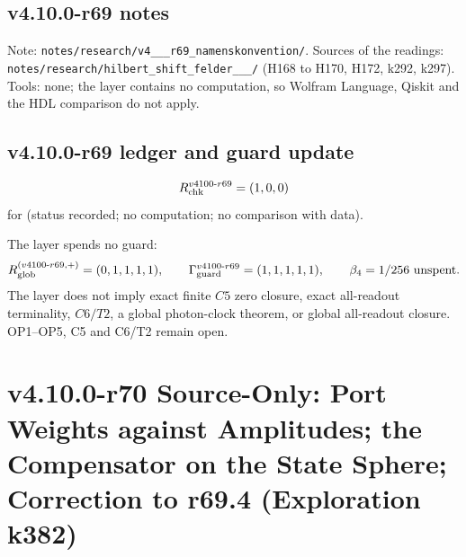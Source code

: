 \subsection*{v4.10.0-r69 notes}
\label{subsec:v4100-r69-notes}

{\raggedright
Note: \texttt{notes/\allowbreak research/\allowbreak v4\_\_\_\allowbreak r69\_\allowbreak namenskonvention/}.
Sources of the readings: \texttt{notes/\allowbreak research/\allowbreak hilbert\_\allowbreak shift\_\allowbreak felder\_\_\_/}
(H168 to H170, H172, k292, k297).
Tools: none; the layer contains no computation, so Wolfram Language, Qiskit and the HDL comparison do not apply.
\par}

\subsection*{v4.10.0-r69 ledger and guard update}
\label{subsec:v4100-r69-ledger-guard}

\[
R_{\rm chk}^{v4100\text{-}r69}=(1,0,0)
\]
for (status recorded; no computation; no comparison with data).

The layer spends no guard:
\[
R_{\rm glob}^{(v4100\text{-}r69,+)}=(0,1,1,1,1),
\qquad
\Gamma_{\rm guard}^{v4100\text{-}r69}=(1,1,1,1,1),
\qquad
\beta_4=1/256\ \text{unspent}.
\]
The layer does not imply exact finite \(C5\) zero closure, exact all-readout terminality, \(C6/T2\), a global photon-clock theorem,
or global all-readout closure.  OP1--OP5, C5 and C6/T2 remain open.

\clearpage
\section*{v4.10.0-r70 Source-Only: Port Weights against Amplitudes; the Compensator on the State Sphere; Correction to r69.4 (Exploration k382)}
\label{sec:v4100-r70-port-weights}

